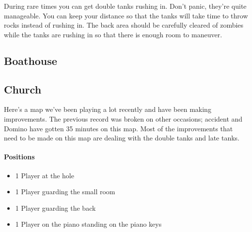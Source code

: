 During rare times you can get double tanks rushing in. Don't panic, they're quite manageable. You can keep your distance so that the tanks will take time to throw rocks instead of rushing in. The back area should be carefully cleared of zombies while the tanks are rushing in so that there is enough room to maneuver.

\subsection{Boathouse}

\subsection{Church}
Here's a map we've been playing a lot recently and have been making improvements. The previous record was broken on other occasions; accident and Domino have gotten 35 minutes on this map. Most of the improvements that need to be made on this map are dealing with the double tanks and late tanks.

\paragraph{Positions}
\begin{itemize}
\item 1 Player at the hole
\item 1 Player guarding the small room
\item 1 Player guarding the back
\item 1 Player on the piano standing on the piano keys
\end{itemize}


